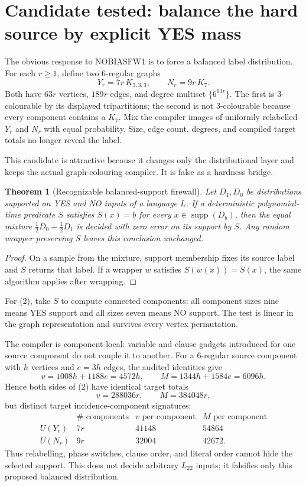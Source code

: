 \documentclass[11pt]{article}
\newtheorem{theorem}{Theorem}
\newcommand{\Ltwo}{L_{22}}
\begin{document}
\section{Candidate tested: balance the hard source by explicit YES mass}
The obvious response to NOBIASFW1 is to force a balanced label distribution.
For each $r\ge1$, define two 6-regular graphs
\[
 Y_r=7r\,K_{3,3,3},\qquad N_r=9r\,K_7.                       \tag{2}
\]
Both have $63r$ vertices, $189r$ edges, and degree multiset
$\{6^{63r}\}$.  The first is 3-colourable by its displayed tripartitions;
the second is not 3-colourable because every component contains a $K_7$.
Mix the compiler images of uniformly relabelled $Y_r$ and $N_r$ with equal
probability.  Size, edge count, degrees, and compiled target totals no longer
reveal the label.

This candidate is attractive because it changes only the distributional
layer and keeps the actual graph-colouring compiler.  It is false as a
hardness bridge.

\begin{theorem}[Recognizable balanced-support firewall]
Let $D_1,D_0$ be distributions supported on YES and NO inputs of a language
$L$.  If a deterministic polynomial-time predicate $S$ satisfies
$S(x)=b$ for every $x\in\operatorname{supp}(D_b)$, then the equal mixture
$\tfrac12D_0+\tfrac12D_1$ is decided with zero error on its support by $S$.
Any random wrapper preserving $S$ leaves this conclusion unchanged.
\end{theorem}
\begin{proof}
On a sample from the mixture, support membership fixes its source label and
$S$ returns that label.  If a wrapper $w$ satisfies $S(w(x))=S(x)$, the same
algorithm applies after wrapping.\qedhere
\end{proof}

For (2), take $S$ to compute connected components: all component sizes nine
means YES support and all sizes seven means NO support.  The test is linear
in the graph representation and survives every vertex permutation.

The compiler is component-local: variable and clause gadgets introduced for
one source component do not couple it to another.  For a 6-regular source
component with $h$ vertices and $e=3h$ edges, the audited identities give
\[
 v=1008h+1188e=4572h,\qquad
 M=1344h+1584e=6096h.                                      \tag{3}
\]
Hence both sides of (2) have identical target totals
\[
 v=288036r,\qquad M=384048r,                               \tag{4}
\]
but distinct target incidence-component signatures:
\[
 \begin{array}{c|c|c|c}
 &\#\text{ components}&v\text{ per component}&M\text{ per component}\\\hline
 U(Y_r)&7r&41148&54864\\
 U(N_r)&9r&32004&42672.
 \end{array}                                                \tag{5}
\]
Thus relabelling, phase switches, clause order, and literal order cannot
hide the selected support.  This does not decide arbitrary $\Ltwo$ inputs;
it falsifies only this proposed balanced distribution.
\end{document}
